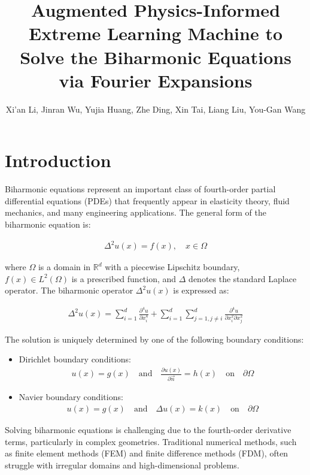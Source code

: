 \documentclass[11pt]{article}
\title{Augmented Physics-Informed Extreme Learning Machine to Solve the Biharmonic Equations via Fourier Expansions}
\author{Xi'an Li, Jinran Wu, Yujia Huang, Zhe Ding, Xin Tai, Liang Liu, You-Gan Wang}
\date{}
\begin{document}
\maketitle

\section{Introduction}

Biharmonic equations represent an important class of fourth-order partial differential equations (PDEs) that frequently appear in elasticity theory, fluid mechanics, and many engineering applications. The general form of the biharmonic equation is:

\begin{align}
    \Delta^2 u(x) = f(x), \quad x \in \Omega
\end{align}

where $\Omega$ is a domain in $\mathbb{R}^d$ with a piecewise Lipschitz boundary, $f(x) \in L^2(\Omega)$ is a prescribed function, and $\Delta$ denotes the standard Laplace operator. The biharmonic operator $\Delta^2 u(x)$ is expressed as:

\begin{align}
    \Delta^2 u(x) = \sum_{i=1}^{d} \frac{\partial^4 u}{\partial x_i^4} + \sum_{i=1}^{d} \sum_{j=1, j\neq i}^{d} \frac{\partial^4 u}{\partial x_i^2 \partial x_j^2}
\end{align}

The solution is uniquely determined by one of the following boundary conditions:

\begin{itemize}
    \item Dirichlet boundary conditions:
    \begin{align}
        u(x) = g(x) \quad \text{and} \quad \frac{\partial u(x)}{\partial \vec{n}} = h(x) \quad \text{on} \quad \partial\Omega
    \end{align}
    
    \item Navier boundary conditions:
    \begin{align}
        u(x) = g(x) \quad \text{and} \quad \Delta u(x) = k(x) \quad \text{on} \quad \partial\Omega
    \end{align}
\end{itemize}

Solving biharmonic equations is challenging due to the fourth-order derivative terms, particularly in complex geometries. Traditional numerical methods, such as finite element methods (FEM) and finite difference methods (FDM), often struggle with irregular domains and high-dimensional problems.
\end{document}
